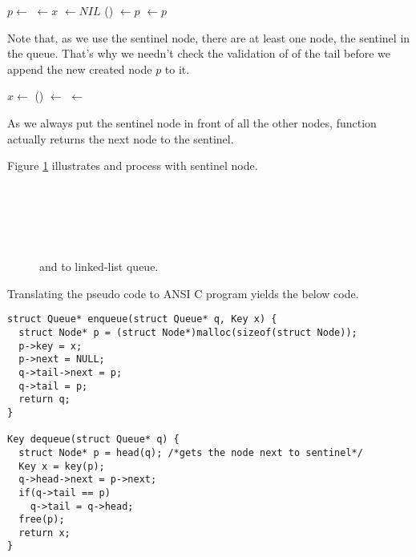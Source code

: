 \documentclass{article}
\begin{document}
\begin{algorithmic}
  \State $p \gets $ 
  \State {} $\gets x$
  \State {} $\gets NIL$
  \State {}() $\gets p$
  \State {} $\gets p$
\EndFunction
\end{algorithmic}

Note that, as we use the sentinel node, there are at least one node, the
sentinel in the queue. That's why we needn't check the validation of
of the tail before we append the new created node $p$ to it.

\begin{algorithmic}
  \State $x \gets $ 
  \State {}() $\gets$ 
   
    \State {} $\gets$ 
  \EndIf
  \State \Return {}
\EndFunction
\end{algorithmic}

As we always put the sentinel node in front of all the other nodes,
function  actually returns the next node to the sentinel.

Figure \ref{fig:list-queue} illustrates  and  process with sentinel node.

\begin{figure}[htbp]
 \centering
  \\
  \\
  \\
  \\
 \caption{ and  to linked-list queue.} \label{fig:list-queue}
\end{figure}

Translating the pseudo code to ANSI C program yields the below code.

\begin{lstlisting}
struct Queue* enqueue(struct Queue* q, Key x) {
  struct Node* p = (struct Node*)malloc(sizeof(struct Node));
  p->key = x;
  p->next = NULL;
  q->tail->next = p;
  q->tail = p;
  return q;
}

Key dequeue(struct Queue* q) {
  struct Node* p = head(q); /*gets the node next to sentinel*/
  Key x = key(p);
  q->head->next = p->next;
  if(q->tail == p)
    q->tail = q->head;
  free(p);
  return x;
}
\end{lstlisting}
\end{document}
